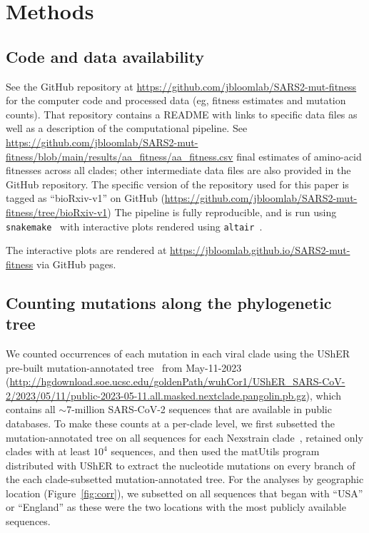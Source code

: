 \documentclass[9pt,twocolumn,twoside]{gsajnl_modified}
\begin{document}
{\small

\section{Methods}
\subsection{Code and data availability}
See the GitHub repository at \url{https://github.com/jbloomlab/SARS2-mut-fitness} for the computer code and processed data (eg, fitness estimates and mutation counts).
That repository contains a README with links to specific data files as well as a description of the computational pipeline.
See \url{https://github.com/jbloomlab/SARS2-mut-fitness/blob/main/results/aa_fitness/aa_fitness.csv} final estimates of amino-acid fitnesses across all clades; other intermediate data files are also provided in the GitHub repository.
The specific version of the repository used for this paper is tagged as ``bioRxiv-v1'' on GitHub (\url{https://github.com/jbloomlab/SARS2-mut-fitness/tree/bioRxiv-v1})
The pipeline is fully reproducible, and is run using \texttt{snakemake}~\citep{molder2021sustainable} with interactive plots rendered using \texttt{altair}~\citep{vanderplas2018altair}.

The interactive plots are rendered at \url{https://jbloomlab.github.io/SARS2-mut-fitness} via GitHub pages.

\subsection{Counting mutations along the phylogenetic tree}
We counted occurrences of each mutation in each viral clade using the UShER pre-built mutation-annotated tree~\citep{mcbroome2021daily,turakhia2021ultrafast,lanfear2020} from May-11-2023 (\url{http://hgdownload.soe.ucsc.edu/goldenPath/wuhCor1/UShER_SARS-CoV-2/2023/05/11/public-2023-05-11.all.masked.nextclade.pangolin.pb.gz}), which contains all $\sim$7-million SARS-CoV-2 sequences that are available in public databases.
To make these counts at a per-clade level, we first subsetted the mutation-annotated tree on all sequences for each Nexstrain clade~\citep{aksamentov2021nextclade}, retained only clades with at least $10^4$ sequences, and then used the matUtils program distributed with UShER to extract the nucleotide mutations on every branch of the each clade-subsetted mutation-annotated tree.
For the analyses by geographic location (Figure~\ref{fig:corr}), we subsetted on all sequences that began with ``USA'' or ``England'' as these were the two locations with the most publicly available sequences.

}
\end{document}
